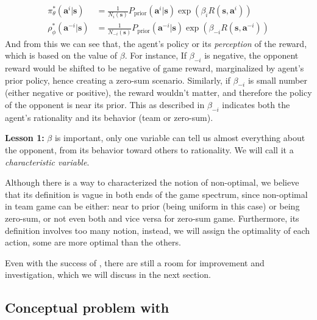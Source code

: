 \begin{equation}
    \begin{aligned}
        \pi_{\theta}^*(\boldsymbol{a}^i | \boldsymbol{s}) &= \frac{1}{N_{i}(\boldsymbol{s})} P_{\text{prior}}(\boldsymbol{a}^i | \boldsymbol{s}) \exp\left( \beta_i R(\boldsymbol{s}, \boldsymbol{a}^i) \right) \\
        \rho_{\phi}^*(\boldsymbol{a}^{-i} | \boldsymbol{s}) &= \frac{1}{N_{-i}(\boldsymbol{s})} P_{\text{prior}}(\boldsymbol{a}^{-i} | \boldsymbol{s}) \exp\left( \beta_{-i} R(\boldsymbol{s}, \boldsymbol{a}^{-i}) \right)
    \end{aligned}
\end{equation}
And from this we can see that, the agent's policy or its \emph{perception} of the reward, which is based on the value of $\beta$. For instance, If $\beta_{-i}$ is negative, the opponent reward would be shifted to be negative of game reward, marginalized by agent's prior policy, hence creating a zero-sum scenario. Similarly, if $\beta_{-i}$ is small number (either negative or positive), the reward wouldn't matter, and therefore the policy of the opponent is near its prior. This as described in \cite{grau2018balancing} $\beta_{-i}$ indicates both the agent's rationality and its behavior (team or zero-sum).

\begin{tcolorbox}
\textbf{Lesson 1: } $\beta$ is important, only one variable can tell us almost everything about the opponent, from its behavior toward others to rationality. We will call it a \emph{characteristic variable}. 
\end{tcolorbox}
Although there is a way to characterized the notion of non-optimal, we believe that its definition is vague in both ends of the game spectrum, since non-optimal in team game can be either: near to prior (being uniform in this case) or being zero-sum, or not even both and vice versa for zero-sum game. Furthermore, its definition involves too many notion, instead, we will assign the optimality of each action, some are more optimal than the others. 

Even with the success of \cite{grau2018balancing}, there are still a room for improvement and investigation, which we will discuss in the next section.

\subsection{Conceptual problem with \cite{grau2018balancing}}

